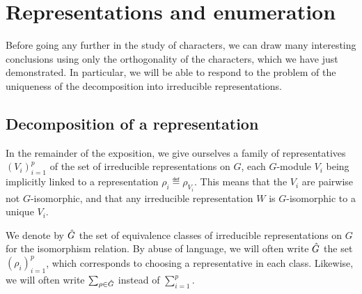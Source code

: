 \section{Representations and enumeration}
 
Before going any further in the study of characters, we can draw many interesting conclusions using only the orthogonality of the characters, which we have just demonstrated. In particular, we will be able to respond to the problem of the uniqueness of the decomposition into irreducible representations.
\subsection{Decomposition of a representation}
\label{sect2-decomposition-representation}
 
 
 In the remainder of the exposition, we give ourselves a family of representatives $ (V_i)_{i = 1}^{p} $ of the set of irreducible representations on $G$, each $G$-module $ V_i $ being implicitly linked to a representation $ \rho_i \eqdef \rho_{V_i} $. This means that the $ V_i $ are pairwise not $G$-isomorphic, and that any irreducible representation $ W $ is $G$-isomorphic to a unique $ V_i $.
 
 
 
 
\begin{defn}
 We denote by $ \hat{G} $ the set of equivalence classes of irreducible representations on $G$ for the isomorphism relation. By abuse of language, we will often write $ \hat{G} $ the set $ (\rho_i)_{i = 1}^p $, which corresponds to choosing a representative in each class. Likewise, we will often write $ \sum_{\rho \in \hat{G}} $ instead of $ \sum_{i = 1}^p $.
\end{defn}
 
